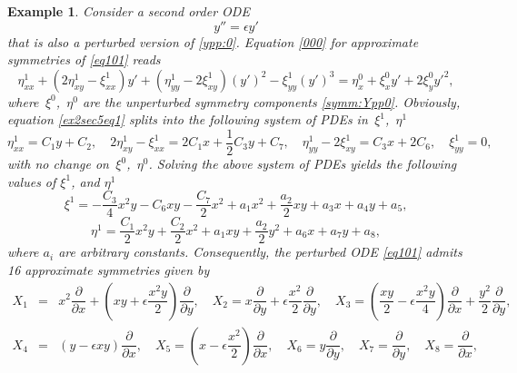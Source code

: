 \documentclass[11pt,letter,subeqn]{article}
\newtheorem{example}{Example}[section]
\begin{document}
\begin{example}\label{ex:all:stable}
       Consider a second order ODE
       \begin{equation}\label{eq101}
         y''=\epsilon y'
       \end{equation}
       that is also a perturbed version of \eqref{ypp:0}. Equation \eqref{000} for approximate symmetries  of \eqref{eq101} reads
       \begin{equation}\label{ex2sec5eq1}
         \eta^1_{xx}+(2\eta^1_{xy}-\xi^1_{xx})y'+(\eta^1_{yy}-2\xi^1_{xy})(y')^2-\xi^1_{yy}(y')^3= \eta^0_{x}+\xi^0_{x} y'+2\xi^0_{y} y'^2,
       \end{equation}
       where \,$\xi^0$,\, $\eta^0$ are the unperturbed symmetry components \eqref{symm:Ypp0}. Obviously, equation \eqref{ex2sec5eq1} splits into the following system of PDEs in \,$\xi^1$,\, $\eta^1$
      \begin{equation}\label{w2}
       \eta^1_{xx} = C_1y+C_2, \quad 2\eta^1_{xy}-\xi^1_{xx} = 2C_1x+\dfrac{1}{2} C_3 y+C_7, \quad \eta^1_{yy}-2\xi^1_{xy} = C_3x+2C_6, \quad \xi^1_{yy} = 0,
      \end{equation}
      with no change on \,$\xi^0$,\, $\eta^0$. Solving the above system of PDEs yields the following values of $\xi^1$, and $\eta^1$
    \begin{equation}
      \xi^1=-\dfrac{C_3}{4}x^2y-C_6xy-\dfrac{C_7}{2}x^2+a_1x^2+\dfrac{a_2}{2}xy+a_3x+a_4y+a_5,
    \end{equation}
    \begin{equation}
      \eta^1=\dfrac{C_1}{2}x^2y+\dfrac{C_2}{2}x^2+a_1xy+\dfrac{a_2}{2}y^2+a_6x+a_7y+a_8,
    \end{equation}
    where $a_i$ are arbitrary constants. Consequently, the perturbed ODE \eqref{eq101} admits 16 approximate symmetries given by
    \begin{eqnarray}\label{eqq}
     \nonumber %
      X_1 &=& x^2\dfrac{\partial}{\partial x}+\left(xy+\epsilon \dfrac{x^2y}{2}\right)\dfrac{\partial}{\partial y},\quad X_2=x\dfrac{\partial}{\partial y}+\epsilon
      \dfrac{x^2}{2}\dfrac{\partial}{\partial y},\quad X_3= \left(\dfrac{xy}{2}-\epsilon \dfrac{x^2y}{4}\right)\dfrac{\partial}{\partial
      x}+\dfrac{y^2}{2}\dfrac{\partial}{\partial y},\\
      \nonumber
       X_4 &=& \left(y-\epsilon xy\right) \dfrac{\partial}{\partial x},\quad X_5=\left(x-\epsilon\dfrac{x^2}{2}\right)\dfrac{\partial}{\partial x},\quad X_6=
       y\dfrac{\partial}{\partial y},\quad X_7= \dfrac{\partial}{\partial y},\quad  X_8= \dfrac{\partial}{\partial x}, \\

\end{eqnarray}
\end{example}
\end{document}
